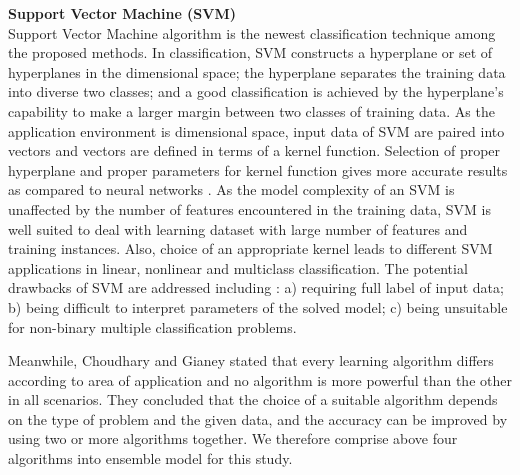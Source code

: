\documentclass[10pt,journal,compsoc]{IEEEtran}
\begin{document}
\textbf{Support Vector Machine (SVM)\\}
Support Vector Machine algorithm is the newest classification technique among the proposed methods. In classification, SVM constructs a hyperplane or set of hyperplanes in the dimensional space; the hyperplane separates the training data into diverse two classes; and a good classification is achieved by the hyperplane's capability to make a larger margin between two classes of training data. As the application environment is dimensional space, input data of SVM are paired into vectors and vectors are defined in terms of a kernel function. Selection of proper hyperplane and proper parameters for kernel function gives more accurate results as compared to neural networks \cite{Somvanshi}. As the model complexity of an SVM is unaffected by the number of features encountered in the training data, SVM is well suited to deal with learning dataset with large number of features and training instances. Also, choice of an appropriate kernel leads to different SVM applications in linear, nonlinear and multiclass classification. The potential drawbacks of SVM are addressed including \cite{Kotsiantis}: a) requiring full label of input data; b) being difficult to interpret parameters of the solved model; c) being unsuitable for non-binary multiple classification problems.

Meanwhile, Choudhary and Gianey \cite{Choudhary} stated that every learning algorithm differs according to area of application and no algorithm is more powerful than the other in all scenarios. They concluded that the choice of a suitable algorithm depends on the type of problem and the given data, and the accuracy can be improved by using two or more algorithms together. We therefore comprise above four algorithms into ensemble model for this study.
\end{document}

